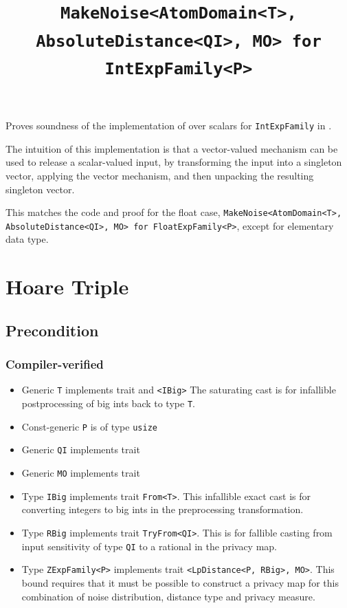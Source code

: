 \documentclass{article}
\title{\texttt{MakeNoise<AtomDomain<T>, AbsoluteDistance<QI>, MO> for IntExpFamily<P>}}
\author{\MichaelShoemateAuthor}
\date{}
\begin{document}
\maketitle

\contrib
Proves soundness of the implementation of  over scalars
for \texttt{IntExpFamily} in .

The intuition of this implementation is that a vector-valued mechanism can be used to release a scalar-valued input,
by transforming the input into a singleton vector,
applying the vector mechanism, and then unpacking the resulting singleton vector.

This matches the code and proof for the float case, \texttt{MakeNoise<AtomDomain<T>, AbsoluteDistance<QI>, MO> for FloatExpFamily<P>},
except for elementary data type.

\section{Hoare Triple}
\subsection*{Precondition}
\subsubsection*{Compiler-verified}

\begin{itemize}
    \item Generic \texttt{T} implements trait  and \texttt{<IBig>}
        The saturating cast is for infallible postprocessing of big ints back to type \texttt{T}.
    \item Const-generic \texttt{P} is of type \texttt{usize}
    \item Generic \texttt{QI} implements trait 
    \item Generic \texttt{MO} implements trait 
    \item Type \texttt{IBig} implements trait \texttt{From<T>}.
        This infallible exact cast is for converting integers to big ints in the preprocessing transformation.
    \item Type \texttt{RBig} implements trait \texttt{TryFrom<QI>}.
        This is for fallible casting from input sensitivity of type \texttt{QI} to a rational in the privacy map.
    \item Type \texttt{ZExpFamily<P>} implements trait \texttt{<LpDistance<P, RBig>, MO>}.
        This bound requires that it must be possible to construct a privacy map for this combination of noise distribution, distance type and privacy measure.
\end{itemize}
\end{document}
